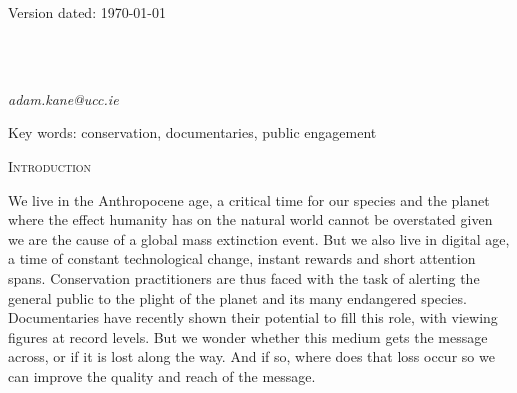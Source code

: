 \documentclass[12pt,letterpaper]{article}
\renewcommand{\section}[1]{%
\bigskip
\begin{center}
\begin{Large}
\normalfont\scshape #1
\medskip
\end{Large}
\end{center}}
\begin{document}
\begin{flushright}
Version dated: \today
\end{flushright}

\bigskip
\medskip
\begin{center}


\bigskip

\\
\\

\end{center}
\medskip
{} \textit{adam.kane@ucc.ie}\\  
\vspace{1in}

\modulolinenumbers[1]
\linenumbers

%
%
\begin{abstract}
\end{abstract}

\noindent Key words: conservation, documentaries, public engagement\\


%
%

\newpage 
\section{Introduction}
We live in the Anthropocene age, a critical time for our species and the planet where the effect humanity has on the natural world cannot be overstated given we are the cause of a global mass extinction event. But we also live in digital age, a time of constant technological change, instant rewards and short attention spans. Conservation practitioners are thus faced with the task of alerting the general public to the plight of the planet and its many endangered species. Documentaries have recently shown their potential to fill this role, with viewing figures at record levels. But we wonder whether this medium gets the message across, or if it is lost along the way. And if so, where does that loss occur so we can improve the quality and reach of the message.
\end{document}
